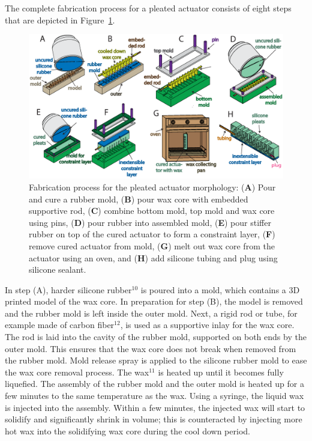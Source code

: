 The complete fabrication process for a pleated actuator consists of eight steps that are depicted in Figure~\ref{fig:pleated_fab}.
\begin{figure}[htb]
\centering
   \includegraphics[width=2\columnwidth]{figures/fabrication/fab_pleated_process_horizontal.eps}
      \caption[Fabrication process for the pleated actuator morphology]{Fabrication process for the pleated actuator morphology: (\textbf{A}) Pour and cure a rubber mold, (\textbf{B}) pour wax core with embedded supportive rod, (\textbf{C}) combine bottom mold, top mold and wax core using pins, (\textbf{D}) pour rubber into assembled mold, (\textbf{E}) pour stiffer rubber on top of the cured actuator to form a constraint layer, (\textbf{F}) remove cured actuator from mold, (\textbf{G}) melt out wax core from the actuator using an oven, and (\textbf{H}) add silicone tubing and plug using silicone sealant.}
      \label{fig:pleated_fab}
\end{figure}
In step (A), harder silicone rubber$^{10}$ is poured into a mold, which contains a 3D printed model of the wax core.
In preparation for step (B), the model is removed and the rubber mold is left inside the outer mold.
Next, a rigid rod or tube, for example made of carbon fiber$^{12}$, is used as a supportive inlay for the wax core.
The rod is laid into the cavity of the rubber mold, supported on both ends by the outer mold.
This ensures that the wax core does not break when removed from the rubber mold.
Mold release spray is applied to the silicone rubber mold to ease the wax core removal process.
The wax$^{11}$ is heated up until it becomes fully liquefied.
The assembly of the rubber mold and the outer mold is heated up for a few minutes to the same temperature as the wax.
Using a syringe, the liquid wax is injected into the assembly.
Within a few minutes, the injected wax will start to solidify and significantly shrink in volume; this is counteracted by injecting more hot wax into the solidifying wax core during the cool down period.
